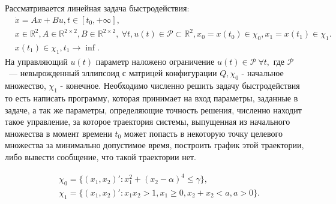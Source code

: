 \documentclass[11pt]{article}
\begin{document}
Рассматривается линейная задача быстродействия:
\begin{equation}\label{mainTask}
\begin{aligned}
&\dot x = Ax + Bu, t\in\left[t_0, +\infty    \right],
\\
&x \in \mathbb{R}^2, A \in \mathbb{R}^{2\times2}, B \in \mathbb{R}^{2\times2},\: \forall t, u(t) \in \mathcal{P}
\subset \mathbb{R}^2,
x_0 = x(t_0) \in \chi_0, x_1 = x(t_1) \in \chi_1.
\\
& x(t_1) \in \chi_1, t_1 \rightarrow \inf.
\end{aligned}
\end{equation}
На управляющий $u(t)$ параметр наложено ограничение $u(t) \in \mathcal{P} \: \forall t,$ где $\mathcal{P}$ ~--- невырожденный эллипсоид
с матрицей конфигурации $Q, \chi_0$ - начальное множество, $\chi_1$ - конечное. Необходимо численно решить задачу быстродействия
то есть написать программу, которая принимает на вход параметры, заданные в задаче, а так же параметры, определяющие точность решения, 
численно находит такое управление, за которое траектория системы, выпущенная из начального множества в момент времени
$t_0$ может попасть в некоторую точку целевого множества за минимально допустимое время, 
построить график этой траектории, либо вывести сообщение, что такой траектории нет.

\begin{equation}
\begin{aligned}
&\chi_0 = \{ \left(x_1, x_2\right)' : x_1^2 + (x_2-\alpha)^4 \le \gamma   \},
\\
&\chi_1 = \{\left(x_1, x_2\right)' : x_1x_2 > 1, x_1 \ge 0, x_2 + x_2 < a, a > 0\}.
\end{aligned}
\end{equation}
\end{document}
